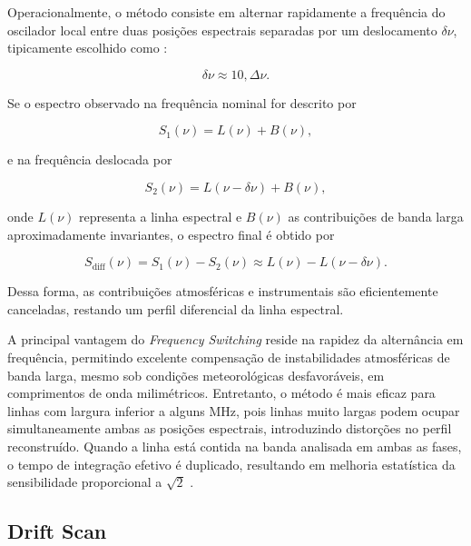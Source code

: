 Operacionalmente, o método consiste em alternar rapidamente a frequência do oscilador local entre duas posições espectrais separadas por um deslocamento $\delta \nu$, tipicamente escolhido como \cite{GBTog2011_green, thompson2017interferometry}:

\begin{equation}
\delta \nu \approx 10 , \Delta \nu.
\end{equation}

Se o espectro observado na frequência nominal for descrito por

\begin{equation}
S_1(\nu) = L(\nu) + B(\nu),
\end{equation}

e na frequência deslocada por

\begin{equation}
S_2(\nu) = L(\nu - \delta \nu) + B(\nu),
\end{equation}

onde $L(\nu)$ representa a linha espectral e $B(\nu)$ as contribuições de banda larga aproximadamente invariantes, o espectro final é obtido por

\begin{equation}
S_{\mathrm{diff}}(\nu) = S_1(\nu) - S_2(\nu) \approx L(\nu) - L(\nu - \delta \nu).
\end{equation}

Dessa forma, as contribuições atmosféricas e instrumentais são eficientemente canceladas, restando um perfil diferencial da linha espectral.

A principal vantagem do \textit{Frequency Switching} reside na rapidez da alternância em frequência, permitindo excelente compensação de instabilidades atmosféricas de banda larga, mesmo sob condições meteorológicas desfavoráveis, em comprimentos de onda milimétricos. Entretanto, o método é mais eficaz para linhas com largura inferior a alguns MHz, pois linhas muito largas podem ocupar simultaneamente ambas as posições espectrais, introduzindo distorções no perfil reconstruído. Quando a linha está contida na banda analisada em ambas as fases, o tempo de integração efetivo é duplicado, resultando em melhoria estatística da sensibilidade proporcional a $\sqrt{2}$ \cite{GBTog2011_green, wilson2013tools}.

\subsection{Drift Scan}

